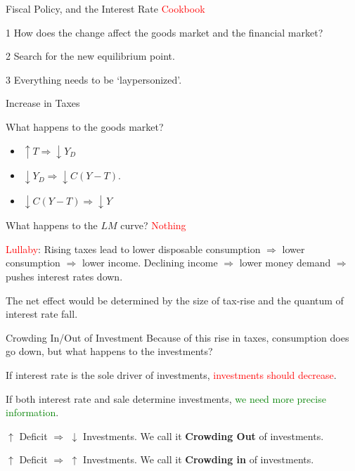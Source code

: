 \documentclass[shownotes,11pt, aspectratio=169]{beamer}
\newenvironment{wideitemize}{\itemize\addtolength{\itemsep}{10pt}}{\enditemize}
\begin{document}
\begin{frame}{Fiscal Policy, and the Interest Rate}
\textcolor{red}{Cookbook}
\begin{wideitemize}
\item[1] How does the change affect the goods market and the financial market?
\item[2] Search for the new equilibrium point.
\item[3] Everything needs to be `laypersonized'.
\end{wideitemize}
\end{frame}

\begin{frame}{Increase in Taxes}
\pause
\begin{wideitemize}
\item What happens to the goods market?
    \begin{itemize}
     \item $\uparrow T \Rightarrow \downarrow Y_D$
     \item $\downarrow Y_D \Rightarrow \downarrow C(Y - T)$. 
     \item $\downarrow C(Y - T) \Rightarrow \downarrow Y$
    \end{itemize}
\pause
\item What happens to the $LM$ curve? \pause \textcolor{red}{Nothing}
\pause
\item \textcolor{red}{Lullaby}: Rising taxes lead to lower disposable consumption $\Rightarrow$ lower consumption $\Rightarrow$ lower income. \pause Declining income $\Rightarrow$ lower money demand $\Rightarrow$ pushes interest rates down.
\pause
\item The net effect would be determined by the size of tax-rise and the quantum of interest rate fall.  
\end{wideitemize}
\end{frame}

\begin{frame}{Crowding In/Out of Investment}
Because of this rise in taxes, consumption does go down, but what happens to the investments? \pause
\begin{wideitemize}
\item If interest rate is the sole driver of investments, \pause \textcolor{red}{investments should decrease}.
\item If both interest rate and sale determine investments, \pause \textcolor{green}{we need more precise information}.
\pause
\item $\uparrow$ Deficit $\Rightarrow$ $\downarrow$ Investments. We call it \textbf{Crowding Out} of investments.
\item $\uparrow$ Deficit $\Rightarrow$ $\uparrow$ Investments. We call it \textbf{Crowding in} of investments.
\end{wideitemize}
\end{frame}
\end{document}
